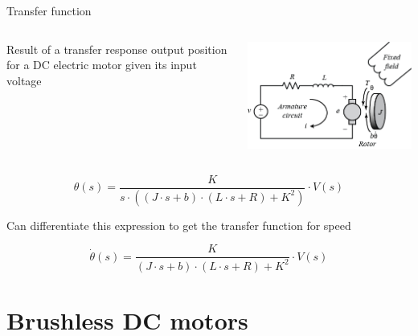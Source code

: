 \documentclass[compress]{beamer}
\begin{document}
\begin{frame}{Transfer function}

    \begin{columns}
        \begin{column}{0.5\linewidth}

            Result of a transfer response output position for a DC electric motor
            given its input voltage

        \end{column}
        \begin{column}{0.5\linewidth}


            \begin{center}
                \includegraphics[width=0.9\columnwidth]{image63}
            \end{center}

        \end{column}
    \end{columns}

\[
    \theta(s) = \frac{K}{s \cdot ( (J \cdot s + b) \cdot (L \cdot s+ R) + K^2)} \cdot V(s)
\]

\pause

Can differentiate this expression to get the transfer function for speed

\[
    \dot\theta(s) = \frac{K}{(J \cdot s + b) \cdot (L \cdot s + R) + K^2} \cdot V(s)
\]


\end{frame}

\section{Brushless DC motors}
\end{document}
